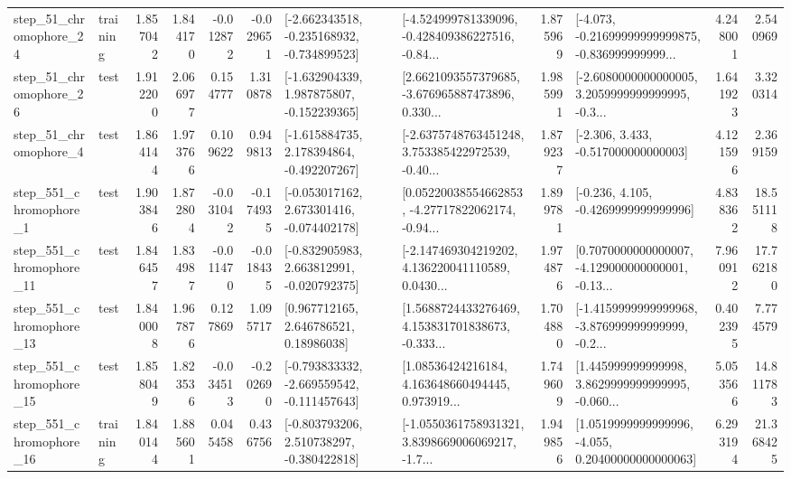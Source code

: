\begin{tabular}{llrrrrllrlrr}
   step\_51\_chromophore\_24 &  training &      1.857042 &    1.844170 &     -0.012872 & -0.029651 &  [-2.662343518, -0.235168932, -0.734899523] &  [-4.524999781339096, -0.428409386227516, -0.84... &       1.875969 &  [-4.073, -0.21699999999999875, -0.836999999999... &            4.248001 &          2.540969 \\
   step\_51\_chromophore\_26 &      test &      1.912200 &    2.066977 &      0.154777 &  1.310878 &   [-1.632904339, 1.987875807, -0.152239365] &  [2.6621093557379685, -3.676965887473896, 0.330... &       1.985991 &  [-2.6080000000000005, 3.2059999999999995, -0.3... &            1.641923 &          3.320314 \\
    step\_51\_chromophore\_4 &      test &      1.864144 &    1.973766 &      0.109622 &  0.949813 &   [-1.615884735, 2.178394864, -0.492207267] &  [-2.6375748763451248, 3.753385422972539, -0.40... &       1.879237 &                [-2.306, 3.433, -0.517000000000003] &            4.121596 &          2.369159 \\
   step\_551\_chromophore\_1 &      test &      1.903846 &    1.872804 &     -0.031042 & -0.174935 &   [-0.053017162, 2.673301416, -0.074402178] &  [0.05220038554662853, -4.27717822062174, -0.94... &       1.899781 &               [-0.236, 4.105, -0.4269999999999996] &            4.838362 &         18.551118 \\
  step\_551\_chromophore\_11 &      test &      1.846457 &    1.834987 &     -0.011470 & -0.018435 &   [-0.832905983, 2.663812991, -0.020792375] &  [-2.147469304219202, 4.136220041110589, 0.0430... &       1.974876 &  [0.7070000000000007, -4.129000000000001, -0.13... &            7.960912 &         17.762180 \\
  step\_551\_chromophore\_13 &      test &      1.840008 &    1.967876 &      0.127869 &  1.095717 &      [0.967712165, 2.646786521, 0.18986038] &  [1.5688724433276469, 4.153831701838673, -0.333... &       1.704880 &  [-1.4159999999999968, -3.876999999999999, -0.2... &            0.402395 &          7.774579 \\
  step\_551\_chromophore\_15 &      test &      1.858049 &    1.823536 &     -0.034513 & -0.202690 &  [-0.793833332, -2.669559542, -0.111457643] &  [1.08536424216184, 4.163648660494445, 0.973919... &       1.749609 &  [1.445999999999998, 3.8629999999999995, -0.060... &            5.053566 &         14.811783 \\
  step\_551\_chromophore\_16 &  training &      1.840144 &    1.885601 &      0.045458 &  0.436756 &   [-0.803793206, 2.510738297, -0.380422818] &  [-1.0550361758931321, 3.8398669006069217, -1.7... &       1.949856 &  [1.0519999999999996, -4.055, 0.20400000000000063] &            6.293194 &         21.368425 \\

\end{tabular}
